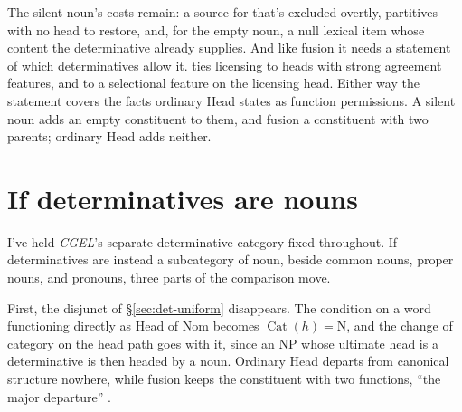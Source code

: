 \documentclass[12pt]{article}
\begin{document}
The silent noun's costs remain: a source for  that's excluded overtly, partitives with no head to restore, and, for the empty noun, a null lexical item whose content the determinative already supplies. And like fusion it needs a statement of which determinatives allow it. \textcite{lobeck1995ellipsis} ties licensing to heads with strong agreement features, and \textcite{saab2019nominal} to a selectional feature on the licensing head. Either way the statement covers the facts ordinary Head states as function permissions. A silent noun adds an empty constituent to them, and fusion a constituent with two parents; ordinary Head adds neither.

\section{If determinatives are nouns}\label{sec:nouns}

I've held \textit{CGEL}'s separate determinative category fixed throughout. If determinatives are instead a subcategory of noun, beside common nouns, proper nouns, and pronouns, three parts of the comparison move.

First, the disjunct of §\ref{sec:det-uniform} disappears. The condition on a word functioning directly as Head of Nom becomes $\operatorname{Cat}(h)=\mathrm{N}$, and the change of category on the head path goes with it, since an NP whose ultimate head is a determinative is then headed by a noun. Ordinary Head departs from canonical structure nowhere, while fusion keeps the constituent with two functions, \enquote{the major departure} \citep[570--571]{Payne2007}.
\end{document}
